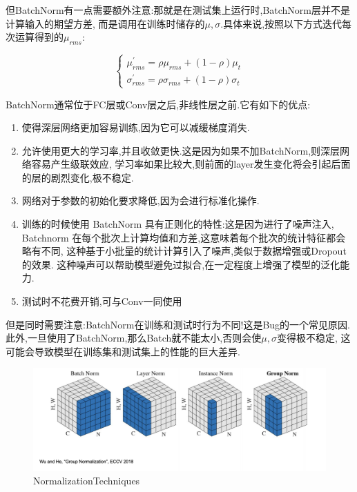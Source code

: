 但BatchNorm有一点需要额外注意:那就是在测试集上运行时,BatchNorm层并不是计算输入的期望方差,
而是调用在训练时储存的$\mu, \sigma$.具体来说,按照以下方式迭代每次运算得到的$\mu_{rms}$:

\begin{equation}
	\begin{cases}
		\mu_{rms}^\prime = \rho \mu_{rms} + (1-\rho) \mu_t 
		\\
		\sigma_{rms}^\prime = \rho \sigma_{rms} + (1-\rho) \sigma_t 
	\end{cases}
\end{equation}

BatchNorm通常位于FC层或Conv层之后,非线性层之前.它有如下的优点:

\begin{enumerate}
	\item 使得深层网络更加容易训练,因为它可以减缓梯度消失.
	\item 允许使用更大的学习率,并且收敛更快.这是因为如果不加BatchNorm,则深层网络容易产生级联效应,
	学习率如果比较大,则前面的layer发生变化将会引起后面的层的剧烈变化,极不稳定.
	\item 网络对于参数的初始化要求降低,因为会进行标准化操作.
	\item 训练的时候使用 BatchNorm 具有正则化的特性:这是因为进行了噪声注入,
	Batchnorm 在每个批次上计算均值和方差,这意味着每个批次的统计特征都会略有不同,
	这种基于小批量的统计计算引入了噪声,类似于数据增强或Dropout的效果.
	这种噪声可以帮助模型避免过拟合,在一定程度上增强了模型的泛化能力.
	\item 测试时不花费开销,可与Conv一同使用
\end{enumerate}

但是同时需要注意:BatchNorm在训练和测试时行为不同!这是Bug的一个常见原因.
此外,一旦使用了BatchNorm,那么Batch就不能太小,否则会使$\mu, \sigma$变得极不稳定,
这可能会导致模型在训练集和测试集上的性能的巨大差异.

\begin{figure}[htbp]
	\centering
	\includegraphics[scale=0.55]{figures/NormalizationTechniques.png}
	\caption{NormalizationTechniques}
	\label{fournorm}
\end{figure}

